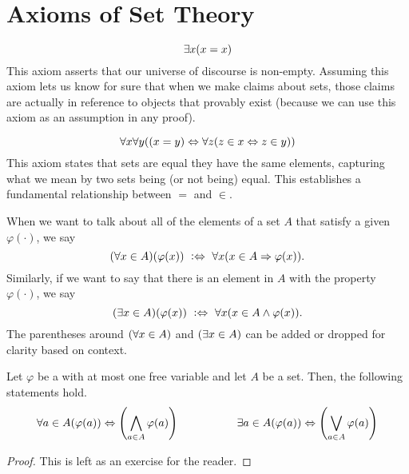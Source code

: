 \section{Axioms of Set Theory}\label{sec:axioms}

\setcounter{preaxiom}{-1}
\begin{axiom}[Existence]\label{ax:existence}
    \vspace{-\abovedisplayskip}
    \[
        \exists x \pn*{x = x}
    \]
    This axiom asserts that our universe of discourse is non-empty.
    Assuming this axiom lets us know for sure that when we make claims about sets,
    those claims are actually in reference to objects that provably exist
    (because we can use this axiom as an assumption in any proof).
\end{axiom}

\begin{axiom}[Extensionality]\label{ax:extensionality}
    \vspace{-\abovedisplayskip}
    \[
        \forall x \forall y \pn*{\pn*{x = y} \iff \forall z \pn*{z \in x \iff z \in y}}
    \]
    This axiom states that sets are equal \ifandonlyif they have the same elements,
    capturing what we mean by two sets being (or not being) equal.
    This establishes a fundamental relationship between \(=\) and \(\in\).
\end{axiom}

\begin{definition}
    When we want to talk about all of the elements of a set \(A\) that satisfy a given {\wff} \(\varphi(\cdot)\),
    we say
    \[
        \pn*{\forall x \in A}\pn*{\varphi(x)} \iffdefn \forall x \pn*{x \in A \implies \varphi(x)}.
    \]
    Similarly, if we want to say that there is an element in \(A\) with the property \(\varphi(\cdot)\),
    we say
    \[
        \pn*{\exists x \in A}\pn*{\varphi(x)} \iffdefn \forall x \pn*{x \in A \meet \varphi(x)}.
    \]
    The parentheses around \(\pn*{\forall x \in A}\) and \(\pn*{\exists x \in A}\)
    can be added or dropped for clarity based on context.
\end{definition}

\begin{theorem}
    Let \(\varphi\) be a {\wff} with at most one free variable and let \(A\) be a set.
    Then, the following statements hold.
    \[
        \forall a \in A \pn*{\varphi(a)} \iff \pn*{\bigmeet_{a \in A}\varphi(a)}
        ~~~~~~~~~~~~~~~~
        \exists a \in A \pn*{\varphi(a)} \iff \pn*{\bigjoin_{a \in A}\varphi(a)}
    \]
\end{theorem}
\begin{proof}
    This is left as an exercise for the reader.
\end{proof}

